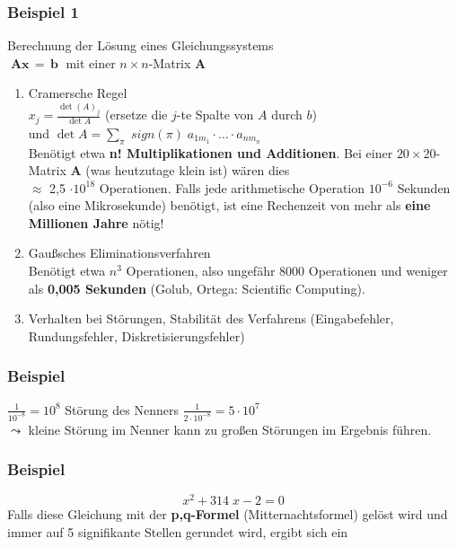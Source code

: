 \documentclass[ngerman,fontsize=11pt, paper=a4, parskip=half, titlepage=true, toc=bib]{scrbook}
\begin{document}
    \subsubsection{Beispiel 1}
    Berechnung der Lösung eines Gleichungssystems 
    \\ $\; \boldsymbol A \boldsymbol x
    	\, = \, \boldsymbol b \;$ mit einer $n \times n$-Matrix $\boldsymbol A$
    \begin{enumerate}
    	\item Cramersche Regel\\
    	$x_j = \frac{\det  (A)_j}{\det A}$ (ersetze die $j$-te
    	Spalte von $A$ durch $b$)\\
    	und $\det A = \sum_{\pi} \; sign (\pi) \; a_{1 m_1} \cdot \ldots \cdot a_{n
    		m_n}$\\
    	Benötigt etwa \textbf{n! Multiplikationen und Additionen}.
    	Bei einer $20 \times 20$-Matrix $\boldsymbol A$ (was
    	heutzutage klein ist) wären dies \\
    	$\approx$ 2,5
    	$\cdot 10^{18}$ Operationen. Falls jede
    	arithmetische Operation $10^{-6}$ Sekunden (also
    	eine Mikrosekunde) benötigt, ist eine Rechenzeit
    	von mehr als \textbf{eine Millionen Jahre} nötig!
    	\item Gaußsches Eliminationsverfahren\\
    	Benötigt etwa $n^3$ Operationen, also ungefähr
    	8000 Operationen und weniger als \textbf{0,005 Sekunden}
    	(Golub, Ortega: Scientific Computing).
    	\item Verhalten bei Störungen, Stabilität des Verfahrens
    	(Eingabefehler, Rundungsfehler, Diskretisierungsfehler)\\
    \end{enumerate}
    
     \subsubsection{Beispiel}
    $\frac{1}{10^{-8}} = 10^8$ Störung des Nenners $\frac{1}{2 \cdot 10^{-8}} = 5 \cdot
    10^7$\\
    $\leadsto$ kleine Störung im Nenner kann zu großen
    Störungen im Ergebnis führen.
    \\
    
    \subsubsection{Beispiel}
    $$x^2 + 314 \; x - 2 = 0$$
    Falls diese Gleichung mit der \textbf{p,q-Formel} (Mitternachtsformel) gelöst wird und immer
    auf 5 signifikante Stellen gerundet wird, ergibt sich ein
    
\end{document}
